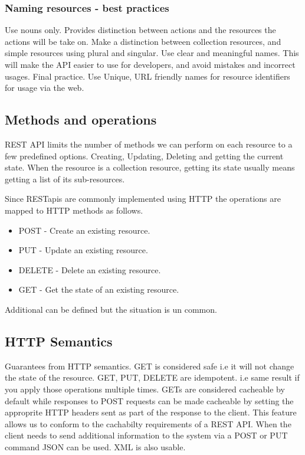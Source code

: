\documentclass[a4paper, 11pt]{book}
\begin{document}
    \subsubsection{Naming resources - best practices}
    Use nouns only. Provides distinction between actions and the resources the actions will be take on.
    Make a distinction between collection resources, and simple resources using plural and singular.
    Use clear and meaningful names. This will make the API easier to use for developers, and avoid mistakes and incorrect usages.
    Final practice. Use Unique, URL friendly names for resource identifiers for usage via the web.

    \subsection{Methods and operations}
    REST API limits the number of methods we can perform on each resource to a few predefined options.
    Creating, Updating, Deleting and getting the current state.
    When the resource is a collection resource, getting its state usually means getting a list of its sub-resources.

    Since RESTapis are commonly implemented using HTTP the operations are mapped to HTTP methods as follows.

    \begin{itemize}
        \item POST - Create an existing resource.
        \item PUT - Update an existing resource.
        \item DELETE - Delete an existing resource.
        \item GET - Get the state of an existing resource.
    \end{itemize}

    Additional can be defined but the situation is un common.

    \subsection{HTTP Semantics}
    Guarantees from HTTP semantics.
    GET is considered safe i.e it will not change the state of the resource.
    GET, PUT, DELETE are idempotent. i.e same result if you apply those operations multiple times.
    GETs are considered cacheable by default while responses to POST requests can be made cacheable by setting the approprite HTTP headers sent as part of the response to the client.
    This feature allows us to conform to the cachabilty requirements of a REST API.
    When the client needs to send additional information to the system via a POST or PUT command JSON can be used. XML is also usable.
\end{document}
